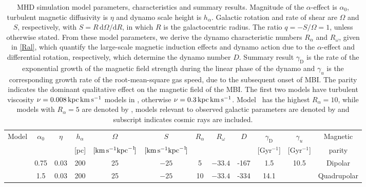 \documentclass[fleqn,usenatbib]{mnras}
\newcommand{\RVOASA}{{\sf{O25}}}
\newcommand{\RXOASA}{{\sf{H25}}}
\newcommand{\dd}{\mathrm{d}}        %
\newcommand\D{_\text{D}} %
\newcommand{\km}{\,{\rm km}}    %
\newcommand{\kpc}{\,{\rm kpc}}  %
\newcommand{\s}{\,{\rm s}}      %
\newcommand{\kms}{\km\s^{-1}}    %
\begin{document}
\begin{table}
    \centering
    \caption{MHD simulation model parameters, characteristics and summary
results. Magnitude of the $\alpha$-effect is $\alpha_0$, turbulent magnetic
diffusivity is $\eta$ and dynamo scale height is $h_\alpha$. Galactic rotation
and rate of shear are $\Omega$ and $S$, respectively, with $S=R\,\dd\Omega/\dd
R$, in which $R$ is the galactocentric radius.  {The ratio $q=-S/\Omega=1$,
unless otherwise stated.} From these model parameters, we derive the dynamo
characteristic numbers $R_{\alpha}$ and $R_{\omega}$, given in \eqref{Ral},
which quantify the large-scale magnetic induction effects and dynamo action due
to the $\alpha$-effect and differential rotation, respectively, which determine
the dynamo number $D$.  Summary result $\gamma\D$ is the rate of the
exponential growth of the magnetic field strength during the linear phase of
the dynamo and $\gamma_{u}$ is the corresponding growth rate of the
root-mean-square gas speed, due to the subsequent onset of MBI. The parity
indicates the dominant qualitative effect on the magnetic field of the MBI. The
first two models have turbulent viscosity $\nu=0.008\kpc\kms$ models in
\citet{QSTGB23}, otherwise $\nu=0.3\kpc\kms$.  {Model \RXOASA\ has the
highest $R_\alpha=10$, while models with $R_\alpha=5$ are denoted by {},
models relevant to observed galactic parameters are denoted by {} and
subscript {} indicates cosmic rays are included.}}
\begin{tabular}{l|ccccc|ccc|ccc}
\cline{1-12}
 Model    &$\alpha_0$  &$\eta$               &$h_\alpha$&$\Omega$                   &$S$                        &$R_\alpha$&$R_\omega$&$D$  &$\gamma\D$  &$\gamma_u$   &   Magnetic     \\
          &\![$\kms$]\!&\![km$\s^{-1}\kpc$]\!&[pc]      &\!$[\!\kms\!\kpc^{-1}\!]$\!&\!$[\!\kms\!\kpc^{-1}\!]$\!&          &          &      &[Gyr$^{-1}$]& [Gyr$^{-1}$]&   parity  \\
\cline{1-12}
 \RVOASA  &0.75        & 0.03                &200       &25                         &   $-25$                   &    5     &   $-33.4$&-167  & 1.5        &   10.5      &    Dipolar     \\
 \RXOASA  &1.5         & 0.03                &200       &25                         &   $-25$                   &    10    &   $-33.4$&-334  & 14.1       &          &    Quadrupolar \\

\end{tabular}
\end{table}
\end{document}
